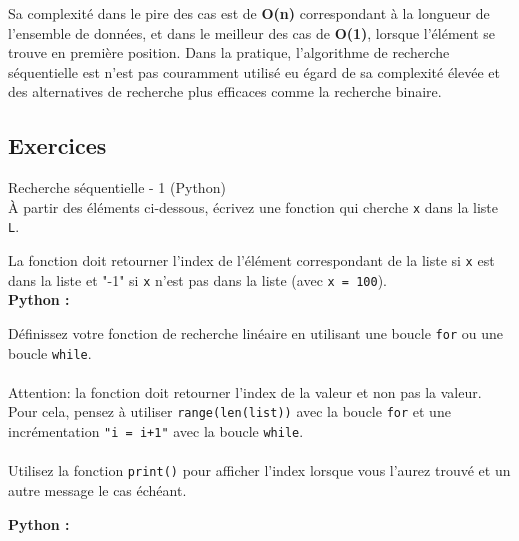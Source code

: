Sa complexité dans le pire des cas est de \textbf{O(n)} correspondant à la longueur de l'ensemble de données, et dans le meilleur des cas de \textbf{O(1)}, lorsque l'élément se trouve en première position. Dans la pratique, l'algorithme de recherche séquentielle est n'est pas couramment utilisé eu égard de sa complexité élevée et des alternatives de recherche plus efficaces comme la recherche binaire.\\



\subsection{Exercices}

\begin{Exercice}[5 minutes] Recherche séquentielle - 1 (Python)\\

À partir des éléments ci-dessous, écrivez une fonction qui cherche \lstinline{x} dans la liste \lstinline{L}.

La fonction doit retourner l'index de l'élément correspondant de la liste si \lstinline{x} est dans la liste et "-1" si \lstinline{x} n'est pas dans la liste (avec \lstinline{x = 100}).\\

\textbf{Python :}
  

\begin{conseil}
    Définissez votre fonction de recherche linéaire en utilisant une boucle \lstinline{for} ou une boucle \lstinline{while}.\\\\
    Attention: la fonction doit retourner l'index de la valeur et non pas la valeur. Pour cela, pensez à utiliser \lstinline{range(len(list))} avec la boucle \lstinline{for} et une incrémentation \lstinline{"i = i+1"} avec la boucle \lstinline{while}.\\\\
    Utilisez la fonction \lstinline{print()} pour afficher l'index lorsque vous l'aurez trouvé et un autre message le cas échéant. 
\end{conseil}
    
\begin{solution}
\textbf{Python :}
    
    
\end{solution}

\end{Exercice}

